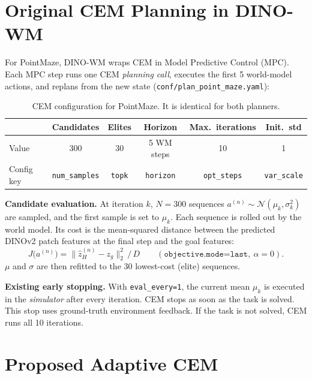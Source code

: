 \documentclass[10pt]{article}
\begin{document}
\section{Original CEM Planning in DINO-WM}

For PointMaze, DINO-WM wraps CEM in Model Predictive Control (MPC). Each MPC step runs one CEM
\emph{planning call}, executes the first 5 world-model actions, and replans from the new state
(\texttt{conf/plan\_point\_maze.yaml}):

\begin{table}[H]
\centering\small
\begin{tabular}{lccccc}
\toprule
 & Candidates & Elites & Horizon & Max.\ iterations & Init.\ std \\
\midrule
Value & 300 & 30 & 5 WM steps & 10 & 1 \\
Config key & \texttt{num\_samples} & \texttt{topk} & \texttt{horizon} & \texttt{opt\_steps} & \texttt{var\_scale} \\
\bottomrule
\end{tabular}
\caption{CEM configuration for PointMaze. It is identical for both planners.}
\label{tab:baseline}
\end{table}

\textbf{Candidate evaluation.} At iteration $k$, $N{=}300$ sequences $a^{(n)}\sim\mathcal{N}(\mu_k,\sigma_k^2)$
are sampled, and the first sample is set to $\mu_k$. Each sequence is rolled out by the world model. Its cost is the mean-squared
distance between the predicted DINOv2 patch features at the final step and the goal features:
\begin{equation}
J\big(a^{(n)}\big) = \big\| \hat z_{H}^{(n)} - z_{g} \big\|_2^2 \,/\, D
\qquad(\texttt{objective.mode=last},\ \alpha{=}0).
\end{equation}
$\mu$ and $\sigma$ are then refitted to the 30 lowest-cost (elite) sequences.

\textbf{Existing early stopping.} With \texttt{eval\_every=1}, the current mean $\mu_k$ is executed in
the \emph{simulator} after every iteration. CEM stops as soon as the task is solved. This stop uses
ground-truth environment feedback. If the task is not solved, CEM runs all 10 iterations.

\section{Proposed Adaptive CEM}
\end{document}
